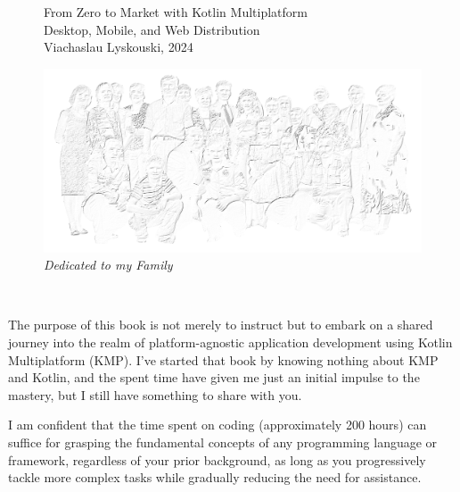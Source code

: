 
\thispagestyle{empty}

\begin{figure}
  \begin{minipage}{0.49\textwidth}
    \large From Zero to Market with Kotlin Multiplatform\\
    \vspace{9mm}
    \noindent \small Desktop, Mobile, and Web Distribution\\
    \vspace{10mm}
    Viachaslau Lyskouski, 2024\\
    \vspace{2mm}
  \end{minipage}
  \hfill
  \begin{minipage}{0.41\textwidth}
    \includegraphics[width=\textwidth]{_cover/to.png}
    \emph{Dedicated to my Family}\\
  \end{minipage}
\end{figure}
~
\vspace{2cm}

\noindent The purpose of this book is not merely to instruct but to embark on a shared journey into the realm of 
platform-agnostic application development using Kotlin Multiplatform (KMP). I've started that book by knowing nothing 
about KMP and Kotlin, and the spent time have given me just an initial impulse to the mastery, but I still have 
something to share with you. 

\vspace{3mm}

\noindent I am confident that the time spent on coding (approximately 200 hours) can suffice for grasping the 
fundamental concepts of any programming language or framework, regardless of your prior background, as long as you 
progressively tackle more complex tasks while gradually reducing the need for assistance.


